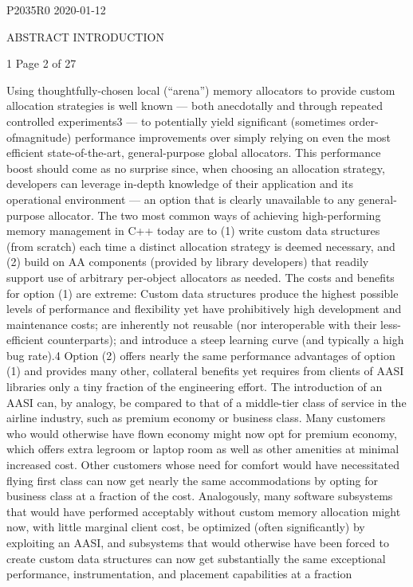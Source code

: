 P2035R0
2020-01-12


ABSTRACT
INTRODUCTION

1 
Page 2 of 27

Using thoughtfully-chosen local (“arena”) memory allocators to provide custom
allocation strategies is well known — both anecdotally and through repeated
controlled experiments3 — to potentially yield significant (sometimes order-ofmagnitude) performance improvements over simply relying on even the most
efficient state-of-the-art, general-purpose global allocators. This performance boost
should come as no surprise since, when choosing an allocation strategy, developers
can leverage in-depth knowledge of their application and its operational environment
— an option that is clearly unavailable to any general-purpose allocator.
The two most common ways of achieving high-performing memory management in
C++ today are to (1) write custom data structures (from scratch) each time a distinct
allocation strategy is deemed necessary, and (2) build on AA components (provided
by library developers) that readily support use of arbitrary per-object allocators as
needed. The costs and benefits for option (1) are extreme: Custom data structures
produce the highest possible levels of performance and flexibility yet have
prohibitively high development and maintenance costs; are inherently not reusable
(nor interoperable with their less-efficient counterparts); and introduce a steep
learning curve (and typically a high bug rate).4 Option (2) offers nearly the same
performance advantages of option (1) and provides many other, collateral benefits
yet requires from clients of AASI libraries only a tiny fraction of the engineering
effort.
The introduction of an AASI can, by analogy, be compared to that of a middle-tier
class of service in the airline industry, such as premium economy or business class.
Many customers who would otherwise have flown economy might now opt for
premium economy, which offers extra legroom or laptop room as well as other
amenities at minimal increased cost. Other customers whose need for comfort would
have necessitated flying first class can now get nearly the same accommodations by
opting for business class at a fraction of the cost. Analogously, many software
subsystems that would have performed acceptably without custom memory
allocation might now, with little marginal client cost, be optimized (often
significantly) by exploiting an AASI, and subsystems that would otherwise have been
forced to create custom data structures can now get substantially the same
exceptional performance, instrumentation, and placement capabilities at a fraction

